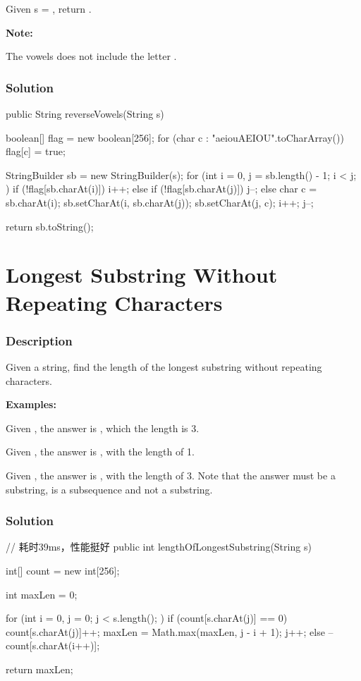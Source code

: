 Given s = , return .

\textbf{Note:}

The vowels does not include the letter .

\subsubsection{Solution}

\begin{Code}
public String reverseVowels(String s) {
    boolean[] flag = new boolean[256];
    for (char c : "aeiouAEIOU".toCharArray()) {
        flag[c] = true;
    }

    StringBuilder sb = new StringBuilder(s);
    for (int i = 0, j = sb.length() - 1; i < j; ) {
        if (!flag[sb.charAt(i)]) {
            i++;
        } else if (!flag[sb.charAt(j)]) {
            j--;
        } else {
            char c = sb.charAt(i);
            sb.setCharAt(i, sb.charAt(j));
            sb.setCharAt(j, c);
            i++;
            j--;
        }
    }

    return sb.toString();
}
\end{Code}

\newpage

\section{Longest Substring Without Repeating Characters} %

\subsubsection{Description}
Given a string, find the length of the longest substring without repeating characters.

\textbf{Examples:}

Given , the answer is , which the length is 3.

Given , the answer is , with the length of 1.

Given , the answer is , with the length of 3. Note that the answer must be a substring,  is a subsequence and not a substring.
\subsubsection{Solution}

\begin{Code}
// 耗时39ms，性能挺好
public int lengthOfLongestSubstring(String s) {
    int[] count = new int[256];

    int maxLen = 0;

    for (int i = 0, j = 0; j < s.length(); ) {
        if (count[s.charAt(j)] == 0) {
            count[s.charAt(j)]++;
            maxLen = Math.max(maxLen, j - i + 1);
            j++;
        } else {
            --count[s.charAt(i++)];
        }
    }

    return maxLen;
}
\end{Code}

